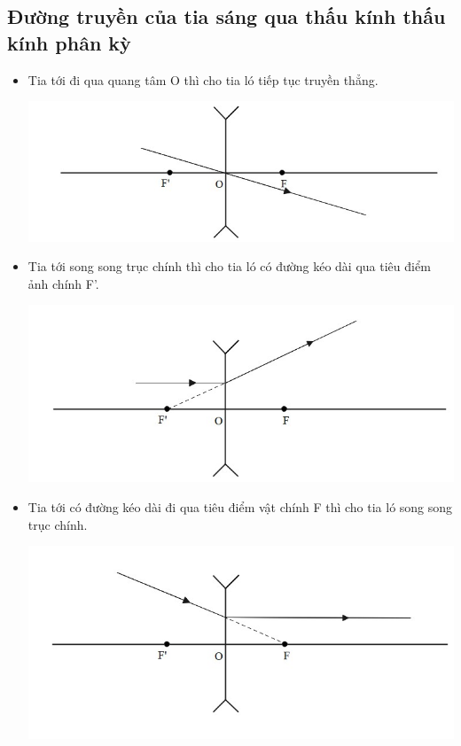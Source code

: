 \subsection{ Đường truyền của tia sáng qua thấu  kính thấu kính phân kỳ}
\begin{itemize}
	\item Tia tới đi qua quang tâm O thì cho tia ló tiếp tục truyền thẳng.
	\begin{center}
		\includegraphics[scale=0.7]{../figs/VN11-PH-38-A-004-1-h22.jpg}
	\end{center}
	\item Tia tới song song trục chính thì cho tia ló có đường kéo dài qua tiêu điểm ảnh chính F'.
	\begin{center}
		\includegraphics[scale=0.7]{../figs/VN11-PH-38-A-004-1-h23.jpg}
	\end{center}
	\item Tia tới có đường kéo dài đi qua tiêu điểm vật chính F thì cho tia ló song song trục chính.
	\begin{center}
		\includegraphics[scale=0.7]{../figs/VN11-PH-38-A-004-1-h24.jpg}
	\end{center} 
\end{itemize}
